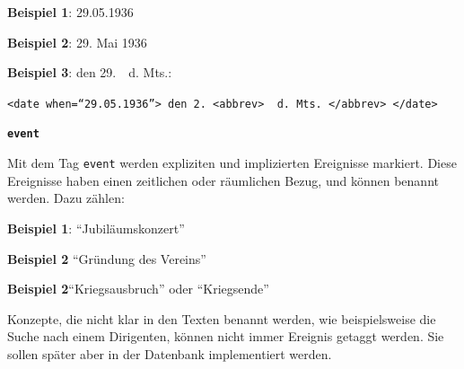 \documentclass[12pt, a4paper, ngerman, bidi=default]{article}
\newcommand{\code}[1]{\colorbox{VeryLightGray}{\texttt{#1}}} %
\begin{document}
\begin{description}
    \noindent \textbf{ Beispiel 1}:  29.05.1936

    \textbf{ Beispiel 2}: 29. Mai 1936

    \textbf{ Beispiel 3}: den 29.\ \  d. Mts.:

    \code{\string<date when=\enquote{29.05.1936}>~den 2.~<abbrev>\ \ d. Mts.~</abbrev> </date>}


    \item\texttt{\textbf{{\colorbox{eventTag}{event}}}}
    
    Mit dem Tag \texttt{\colorbox{eventTag}{event}} werden expliziten und implizierten Ereignisse markiert. Diese Ereignisse haben einen zeitlichen oder räumlichen Bezug, und können benannt werden. Dazu zählen:

    \noindent \textbf{ Beispiel 1}: \enquote{Jubiläumskonzert}

    \textbf{ Beispiel 2} \enquote{Gründung des Vereins} 

    \textbf{ Beispiel 2}\enquote{Kriegsausbruch} oder \enquote{Kriegsende}

    Konzepte, die nicht klar in den Texten benannt werden, wie beispielsweise die Suche nach einem Dirigenten, können nicht immer Ereignis getaggt werden. Sie sollen später aber in der Datenbank implementiert werden.
    \end{description}
    
   
\end{document}
